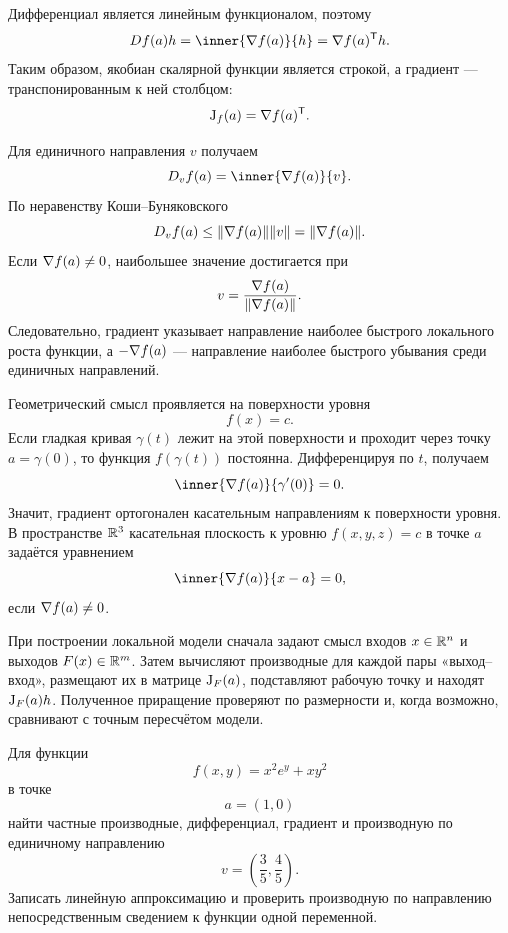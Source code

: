 Дифференциал является линейным функционалом, поэтому
\begin{equation}
Df(a)h
=
\inner{\grad f(a)}{h}
=
\grad f(a)^{\trans}h.
\label{eq:differential-gradient}
\end{equation}
Таким образом, якобиан скалярной функции является строкой, а градиент --- транспонированным к ней столбцом:
\[
\mathrm{J}_{f}(a)=\nabla f(a)^{\mathsf{T}}.
\]

Для единичного направления \(v\) получаем
\begin{equation}
D_vf(a)
=
\inner{\grad f(a)}{v}.
\label{eq:directional-gradient}
\end{equation}
По неравенству Коши--Буняковского
\[
D_vf(a)
\leq
\lVert\nabla f(a)\rVert\lVert v\rVert
=
\lVert\nabla f(a)\rVert.
\]
Если \(\nabla f(a)\neq0\), наибольшее значение достигается при
\[
v=\frac{\nabla f(a)}{\lVert\nabla f(a)\rVert}.
\]
Следовательно, градиент указывает направление наиболее быстрого локального роста функции, а \(-\nabla f(a)\) --- направление наиболее быстрого убывания среди единичных направлений.

Геометрический смысл проявляется на поверхности уровня
\[
f(x)=c.
\]
Если гладкая кривая \(\gamma(t)\) лежит на этой поверхности и проходит через точку \(a=\gamma(0)\), то функция \(f(\gamma(t))\) постоянна. Дифференцируя по \(t\), получаем
\[
\inner{\grad f(a)}{\gamma'(0)}=0.
\]
Значит, градиент ортогонален касательным направлениям к поверхности уровня. В пространстве \(\mathbb{R}^3\) касательная плоскость к уровню \(f(x,y,z)=c\) в точке \(a\) задаётся уравнением
\[
\inner{\grad f(a)}{x-a}=0,
\]
если \(\nabla f(a)\neq0\).

При построении локальной модели сначала задают смысл входов \(x\in\mathbb{R}^n\) и выходов \(F(x)\in\mathbb{R}^m\). Затем вычисляют производные для каждой пары «выход--вход», размещают их в матрице \(\mathrm{J}_{F}(a)\), подставляют рабочую точку и находят \(\mathrm{J}_{F}(a)h\). Полученное приращение проверяют по размерности и, когда возможно, сравнивают с точным пересчётом модели.

\begin{problem}
Для функции
\[
f(x,y)=x^2e^y+xy^2
\]
в точке
\[
a=(1,0)
\]
найти частные производные, дифференциал, градиент и производную по единичному направлению
\[
v=\left(\frac35,\frac45\right).
\]
Записать линейную аппроксимацию и проверить производную по направлению непосредственным сведением к функции одной переменной.
\end{problem}

